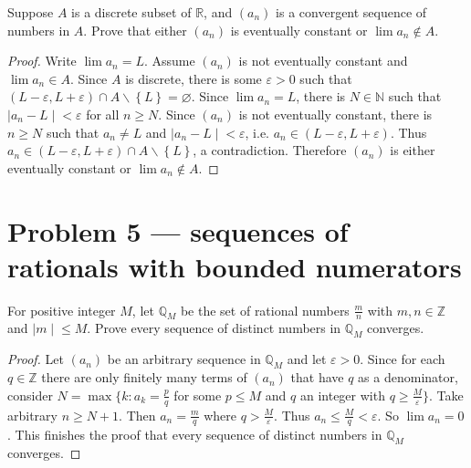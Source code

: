 Suppose \(A\) is a discrete subset of \(\mathbb{R}\), and \(\left( a_{n} \right)\) is a convergent sequence of numbers in \(A\). Prove that either \(\left( a_{n} \right)\) is eventually constant or \(\lim a_{n} \notin A\).

\begin{proof}

Write \(\lim a_{n} = L\). Assume \(\left( a_{n} \right)\) is not eventually constant and \(\lim a_{n} \in A\). Since \(A\) is discrete, there is some \(\varepsilon > 0\) such that \(\left( {L - \varepsilon,L + \varepsilon} \right) \cap A \smallsetminus \left\{ L \right\} = \varnothing\). Since \(\lim a_{n} = L\), there is \(N \in \mathbb{N}\) such that \(\left. |a_{n} - L \middle| < \varepsilon \right.\) for all \(n \geq N\). Since \(\left( a_{n} \right)\) is not eventually constant, there is \(n \geq N\) such that \(a_{n} \neq L\) and \(\left. |a_{n} - L \middle| < \varepsilon \right.\), i.e. \(a_{n} \in \left( {L - \varepsilon,L + \varepsilon} \right)\). Thus \(a_{n} \in \left( {L - \varepsilon,L + \varepsilon} \right) \cap A \smallsetminus \left\{ L \right\}\), a contradiction. Therefore \(\left( a_{n} \right)\) is either eventually constant or \(\lim a_{n} \notin A\).

\end{proof}

\section{Problem 5 --- sequences of rationals with bounded numerators}

For positive integer \(M\), let \(\mathbb{Q}_{M}\) be the set of rational numbers \(\frac{m}{n}\) with \(m,n \in \mathbb{Z}\) and \(\left. |m \middle| \leq M \right.\). Prove every sequence of distinct numbers in \(\mathbb{Q}_{M}\) converges.

\begin{proof}

Let \(\left( a_{n} \right)\) be an arbitrary sequence in \(\mathbb{Q}_{M}\) and let \(\varepsilon > 0\). Since for each \(q \in \mathbb{Z}\) there are only finitely many terms of \(\left( a_{n} \right)\) that have \(q\) as a denominator, consider \(N = \max\{ k:a_{k} = \frac{p}{q}\) for some \(p \leq M\) and \(q\) an integer with \(q \geq \frac{M}{\varepsilon}\}.\) Take arbitrary \(n \geq N + 1\). Then \(a_{n} = \frac{m}{q}\) where \(q > \frac{M}{\varepsilon}\). Thus \(a_{n} \leq \frac{M}{q} < \varepsilon\). So \(\lim a_{n} = 0\). This finishes the proof that every sequence of distinct numbers in \(\mathbb{Q}_{M}\) converges.

\end{proof}

